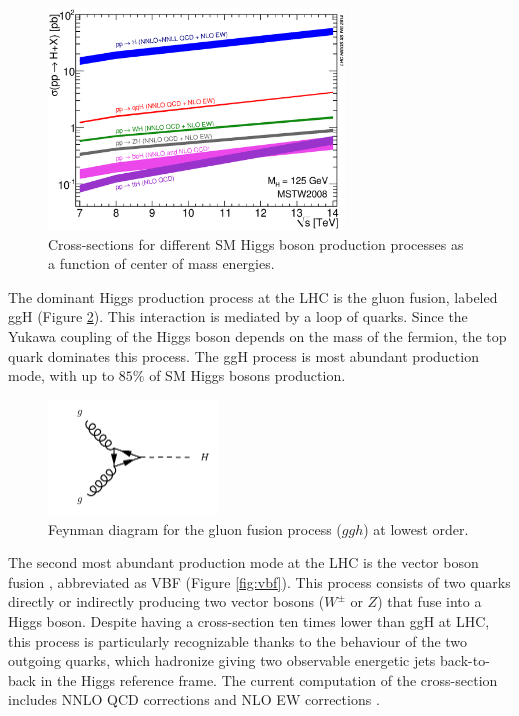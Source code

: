 \begin{figure}
    \centering
    \includegraphics[width=0.7\textwidth]{Images/xsec.eps}
    \caption{Cross-sections for different SM Higgs boson production processes as a function of center of mass energies.}
    \label{fig:higgscrosssec}
\end{figure}

The dominant Higgs production process at the LHC is the gluon fusion, labeled ggH (Figure \ref{fig:ggh}). This interaction is mediated by a loop of quarks. Since the Yukawa coupling of the Higgs boson depends on the mass of the fermion, the top quark dominates this process. The ggH process is most abundant production mode, with up to $85\%$ of SM Higgs bosons production.


\begin{figure}
    \centering
    \includegraphics[width=0.4\textwidth]{Images/ggh.pdf}
    \caption{Feynman diagram for the gluon fusion process ($ggh$) at lowest order.}
    \label{fig:ggh}
\end{figure}


The second most abundant production mode at the LHC is the vector boson fusion \cite{PhysRevD.85.035002}, abbreviated as VBF (Figure \ref{fig:vbf}). This process consists of two quarks directly or indirectly producing two vector bosons ($W^{\pm}$ or $Z$) that fuse into a Higgs boson. Despite having a cross-section ten times lower than ggH at LHC, this process is particularly recognizable thanks to the behaviour of the two outgoing quarks, which hadronize giving two observable energetic jets back-to-back in the Higgs reference frame. The current computation of the cross-section includes NNLO QCD corrections and NLO EW corrections \cite{deFlorian:2227475}.


